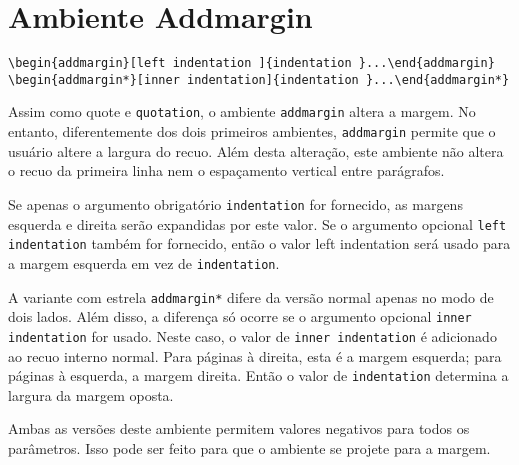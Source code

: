\chapter{Ambiente Addmargin}

\begin{verbatim}
\begin{addmargin}[left indentation ]{indentation }...\end{addmargin}
\begin{addmargin*}[inner indentation]{indentation }...\end{addmargin*}
\end{verbatim}

Assim como quote e \texttt{quotation}, o ambiente \texttt{addmargin} altera a margem. No entanto, diferentemente dos dois primeiros ambientes, \texttt{addmargin} permite que o usuário altere a largura do recuo. Além desta alteração, este ambiente não altera o recuo da primeira linha nem o espaçamento vertical entre parágrafos.

Se apenas o argumento obrigatório \texttt{indentation} for fornecido, as margens esquerda e direita serão expandidas por este valor. Se o argumento opcional \texttt{left indentation} também for fornecido, então o valor left indentation será usado para a margem esquerda em vez de \texttt{indentation}.

A variante com estrela \texttt{addmargin*} difere da versão normal apenas no modo de dois lados. Além disso, a diferença só ocorre se o argumento opcional \texttt{inner indentation} for usado. Neste caso, o valor de \texttt{inner indentation} é adicionado ao recuo interno normal. Para páginas à direita, esta é a margem esquerda; para páginas à esquerda, a margem direita. Então o valor de \texttt{indentation} determina a largura da margem oposta.

Ambas as versões deste ambiente permitem valores negativos para todos os parâmetros. Isso pode ser feito para que o ambiente se projete para a margem.
